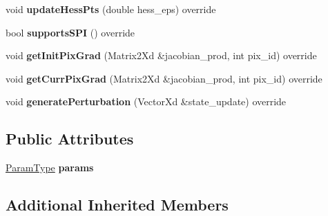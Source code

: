\begin{DoxyCompactItemize}
\item 
\hypertarget{classTPS_a64f8fe0659cfed2a37c18a1c99e504da}{void {\bfseries update\-Hess\-Pts} (double hess\-\_\-eps) override}\label{classTPS_a64f8fe0659cfed2a37c18a1c99e504da}

\item 
\hypertarget{classTPS_a4c720444f5ffb3589f95a0f764c10fa9}{bool {\bfseries supports\-S\-P\-I} () override}\label{classTPS_a4c720444f5ffb3589f95a0f764c10fa9}

\item 
\hypertarget{classTPS_a2105a387550be14e7c01a30c542c9160}{void {\bfseries get\-Init\-Pix\-Grad} (Matrix2\-Xd \&jacobian\-\_\-prod, int pix\-\_\-id) override}\label{classTPS_a2105a387550be14e7c01a30c542c9160}

\item 
\hypertarget{classTPS_ae2bc945031092b0cd08b574e93e0f54c}{void {\bfseries get\-Curr\-Pix\-Grad} (Matrix2\-Xd \&jacobian\-\_\-prod, int pix\-\_\-id) override}\label{classTPS_ae2bc945031092b0cd08b574e93e0f54c}

\item 
\hypertarget{classTPS_a25f86088ce79f9f1e4874a5a182f134c}{void {\bfseries generate\-Perturbation} (Vector\-Xd \&state\-\_\-update) override}\label{classTPS_a25f86088ce79f9f1e4874a5a182f134c}

\end{DoxyCompactItemize}
\subsection*{Public Attributes}
\begin{DoxyCompactItemize}
\item 
\hypertarget{classTPS_ad2b66fb6a1478a489dbf2385b2b2dc0b}{\hyperlink{structTPSParams}{Param\-Type} {\bfseries params}}\label{classTPS_ad2b66fb6a1478a489dbf2385b2b2dc0b}

\end{DoxyCompactItemize}
\subsection*{Additional Inherited Members}


